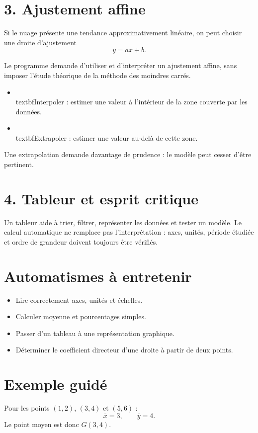 \section{3. Ajustement affine}
Si le nuage présente une tendance approximativement linéaire, on peut choisir une droite d'ajustement
\[
y=ax+b.
\]

Le programme demande d'utiliser et d'interpréter un ajustement affine, sans imposer l'étude théorique de la méthode des moindres carrés.

\begin{itemize}
\item \\textbf{Interpoler} : estimer une valeur à l'intérieur de la zone couverte par les données.
\item \\textbf{Extrapoler} : estimer une valeur au-delà de cette zone.
\end{itemize}

Une extrapolation demande davantage de prudence : le modèle peut cesser d'être pertinent.

\section{4. Tableur et esprit critique}
Un tableur aide à trier, filtrer, représenter les données et tester un modèle. Le calcul automatique ne remplace pas l'interprétation : axes, unités, période étudiée et ordre de grandeur doivent toujours être vérifiés.

\section{Automatismes à entretenir}
\begin{itemize}
\item Lire correctement axes, unités et échelles.
\item Calculer moyenne et pourcentages simples.
\item Passer d'un tableau à une représentation graphique.
\item Déterminer le coefficient directeur d'une droite à partir de deux points.
\end{itemize}

\section{Exemple guidé}
Pour les points $(1,2)$, $(3,4)$ et $(5,6)$ :
\[
\bar x=3,\qquad \bar y=4.
\]
Le point moyen est donc $G(3,4)$.

